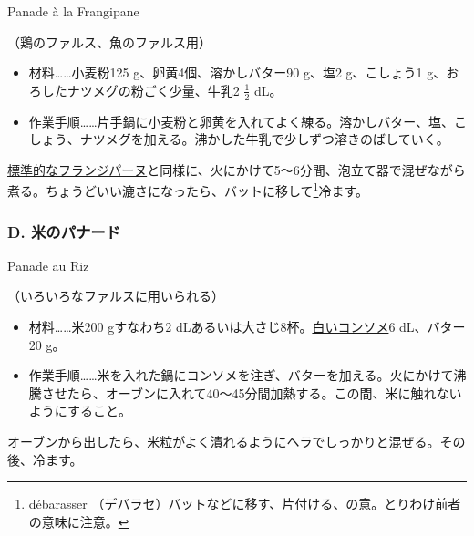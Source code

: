 \begin{recette}
\begin{frsubenv}
Panade à la Frangipane

\end{frsubenv}


（鶏のファルス、魚のファルス用）

\begin{itemize}
\item
  材料\ldots{}\ldots{}小麦粉125 g、卵黄4個、溶かしバター90 g、塩2
  g、こしょう1 g、おろしたナツメグの粉ごく少量、牛乳2 \(\frac{1}{2}\)
  dL。
\item
  作業手順\ldots{}\ldots{}片手鍋に小麦粉と卵黄を入れてよく練る。溶かしバター、塩、こしょう、ナツメグを加える。沸かした牛乳で少しずつ溶きのばしていく。
\end{itemize}

\protect\hyperlink{creme-frangipane}{標準的なフランジパーヌ}と同様に、火にかけて5〜6分間、泡立て器で混ぜながら煮る。ちょうどいい漉さになったら、バットに移して\footnote{débarasser
  （デバラセ）バットなどに移す、片付ける、の意。とりわけ前者の意味に注意。}冷ます。

\atoaki{}

\hypertarget{panade-d}{%
\subsubsection{D. 米のパナード}\label{panade-d}}

\begin{frsubenv}

Panade au Riz

\end{frsubenv}


（いろいろなファルスに用いられる）

\begin{itemize}
\item
  材料\ldots{}\ldots{}米200 gすなわち2
  dLあるいは大さじ8杯。\protect\hyperlink{}{白いコンソメ}6 dL、バター20
  g。
\item
  作業手順\ldots{}\ldots{}米を入れた鍋にコンソメを注ぎ、バターを加える。火にかけて沸騰させたら、オーブンに入れて40〜45分間加熱する。この間、米に触れないようにすること。
\end{itemize}

オーブンから出したら、米粒がよく潰れるようにヘラでしっかりと混ぜる。その後、冷ます。


\end{recette}
